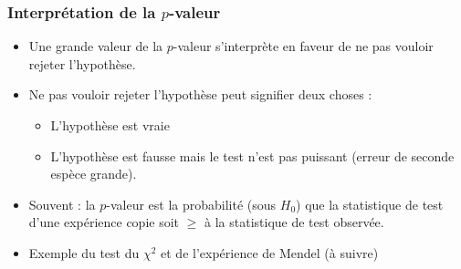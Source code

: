 \begin{frame}
\frametitle{Interprétation de la $p$-valeur}
\begin{itemize}
\item Une grande valeur de la $p$-valeur s'interprète en faveur de \alert{ne pas vouloir rejeter l'hypothèse}.
\item  Ne pas vouloir rejeter l'hypothèse  peut signifier deux choses :
\begin{itemize}
\item L'hypothèse est vraie
\item L'hypothèse est fausse \alert{ mais} le test n'est pas \alert{puissant} (erreur de seconde espèce \alert{grande}).
\end{itemize}
\item \alert{Souvent :} la $p$-valeur est la probabilité (sous $H_0$) que la statistique de test d'une expérience  copie  soit $\geq$ à la statistique de test observée.
\item \alert{Exemple du test du $\chi^2$ et de l'expérience de Mendel} (à suivre) %
\end{itemize}
\end{frame}





